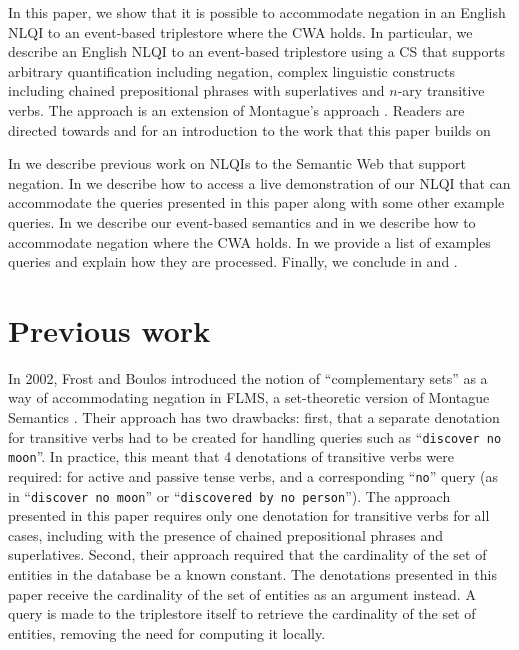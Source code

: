 \documentclass[../main.tex]{subfiles}
\begin{document}
\begin{refsection}
In this paper, we show that it is possible to accommodate negation in an English NLQI to an event-based triplestore where the CWA holds.
In particular, we describe an English NLQI to an event-based triplestore using a CS that supports arbitrary quantification including negation, complex linguistic constructs including chained prepositional phrases with superlatives and $n$-ary transitive verbs.
The approach is an extension of Montague’s approach \cite{Dowty:wall}.  Readers are
directed towards \cite{frostpeelar2019} and \cite{peelar2020webistjournal} for an introduction to the work that this paper builds on

In  we describe previous work on NLQIs to the Semantic Web that support negation.  In  we describe how to access a live demonstration of our NLQI that can accommodate the queries presented in this paper along with some other example queries.  In  we describe our event-based semantics and in  we describe how to accommodate negation where the CWA holds. In  we provide a list of examples queries and explain how they are processed.  Finally, we conclude in  and .



\section{Previous work}
\label{webist2020conf:prevwork}

In 2002, Frost and Boulos introduced the notion of ``complementary sets'' as a way of accommodating negation in FLMS, a set-theoretic version of Montague Semantics \cite{frostboulos2002}. Their approach has two drawbacks: first, that a separate denotation for transitive verbs had to be created for handling queries such as ``\texttt{discover no moon}''.  In practice, this meant that 4 denotations of transitive verbs were required: for active and passive tense verbs, and a corresponding ``\texttt{no}'' query (as in ``\texttt{discover no moon}'' or ``\texttt{discovered by no person}'').  The approach presented in this paper requires only one denotation for transitive verbs for all cases, including with the presence of chained prepositional phrases and superlatives.  Second, their approach required that the cardinality of the set of entities in the database be a known constant.  The denotations presented in this paper receive the cardinality of the set of entities as an argument instead.  A query is made to the triplestore itself to retrieve the cardinality of the set of entities, removing the need for computing it locally.


\end{refsection}
\end{document}
